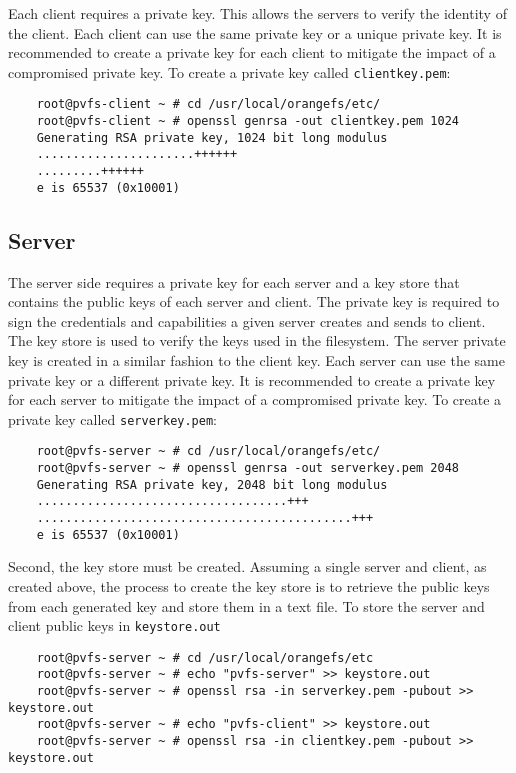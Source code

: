 \documentclass[11pt, letterpaper]{article}
\begin{document}
Each client requires a private key. This allows the servers to verify the 
identity of the client. Each client can use the same private key or a unique 
private key. It is recommended to create a private key for each client to 
mitigate the impact of a compromised private key. To create a private key 
called \texttt{clientkey.pem}:

\begin{verbatim}
    root@pvfs-client ~ # cd /usr/local/orangefs/etc/
    root@pvfs-client ~ # openssl genrsa -out clientkey.pem 1024
    Generating RSA private key, 1024 bit long modulus
    ......................++++++
    .........++++++
    e is 65537 (0x10001)
\end{verbatim}

\subsection{Server}

The server side requires a private key for each server and a key store that 
contains the public keys of each server and client. The private key is 
required to sign the credentials and capabilities a given server creates and 
sends to client. The key store is used to verify the keys used in the 
filesystem. The server private key is created in a similar fashion to the 
client key. Each server can use the same private key or a different private key.
It is recommended to create a private key for each server to mitigate the 
impact of a compromised private key. To create a private key called 
\texttt{serverkey.pem}:

\begin{verbatim}
    root@pvfs-server ~ # cd /usr/local/orangefs/etc/
    root@pvfs-server ~ # openssl genrsa -out serverkey.pem 2048
    Generating RSA private key, 2048 bit long modulus
    ...................................+++
    ............................................+++
    e is 65537 (0x10001)
\end{verbatim}

Second, the key store must be created. Assuming a single server and client, 
as created above, the process to create the key store is to retrieve the public
keys from each generated key and store them in a text file. To store the server
and client public keys in \texttt{keystore.out}

\begin{verbatim}
    root@pvfs-server ~ # cd /usr/local/orangefs/etc
    root@pvfs-server ~ # echo "pvfs-server" >> keystore.out
    root@pvfs-server ~ # openssl rsa -in serverkey.pem -pubout >> keystore.out
    root@pvfs-server ~ # echo "pvfs-client" >> keystore.out
    root@pvfs-server ~ # openssl rsa -in clientkey.pem -pubout >> keystore.out
\end{verbatim}
\end{document}

